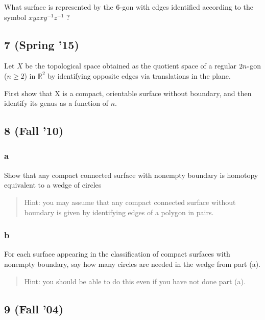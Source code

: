 What surface is represented by the \(6{\hbox{-}}\)gon with edges
identified according to the symbol \(xyzxy^{-1}z^{-1}\) ?

\hypertarget{spring-15-7}{%
\subsection{7 (Spring '15)}\label{spring-15-7}}

Let \(X\) be the topological space obtained as the quotient space of a
regular \(2n{\hbox{-}}\)gon (\(n \geq 2\)) in \({\mathbb{R}}^2\) by
identifying opposite edges via translations in the plane.

First show that X is a compact, orientable surface without boundary, and
then identify its genus as a function of \(n\).

\hypertarget{fall-10-2}{%
\subsection{8 (Fall '10)}\label{fall-10-2}}

\hypertarget{a-3}{%
\subsubsection{a}\label{a-3}}

Show that any compact connected surface with nonempty boundary is
homotopy equivalent to a wedge of circles

\begin{quote}
Hint: you may assume that any compact connected surface without boundary
is given by identifying edges of a polygon in pairs.
\end{quote}

\hypertarget{b-3}{%
\subsubsection{b}\label{b-3}}

For each surface appearing in the classification of compact surfaces
with nonempty boundary, say how many circles are needed in the wedge
from part (a).

\begin{quote}
Hint: you should be able to do this even if you have not done part (a).
\end{quote}

\hypertarget{fall-04-4}{%
\subsection{9 (Fall '04)}\label{fall-04-4}}

